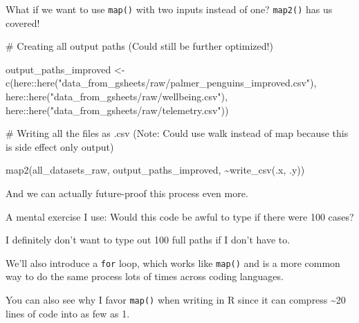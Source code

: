 \documentclass[
  letterpaper,
  DIV=11,
  numbers=noendperiod]{scrreprt}
\newenvironment{Shaded}{\begin{snugshade}}{\end{snugshade}}
\newcommand{\CommentTok}[1]{\textcolor[rgb]{0.37,0.37,0.37}{#1}}
\newcommand{\FunctionTok}[1]{\textcolor[rgb]{0.28,0.35,0.67}{#1}}
\newcommand{\NormalTok}[1]{\textcolor[rgb]{0.00,0.23,0.31}{#1}}
\newcommand{\OtherTok}[1]{\textcolor[rgb]{0.00,0.23,0.31}{#1}}
\newcommand{\SpecialCharTok}[1]{\textcolor[rgb]{0.37,0.37,0.37}{#1}}
\newcommand{\StringTok}[1]{\textcolor[rgb]{0.13,0.47,0.30}{#1}}
\begin{document}
What if we want to use \texttt{map()} with two inputs instead of one?
\texttt{map2()} has us covered!

\begin{Shaded}
\begin{Highlighting}[]
\CommentTok{\# Creating all output paths (Could still be further optimized!)}

\NormalTok{output\_paths\_improved }\OtherTok{\textless{}{-}} \FunctionTok{c}\NormalTok{(here}\SpecialCharTok{::}\FunctionTok{here}\NormalTok{(}\StringTok{"data\_from\_gsheets/raw/palmer\_penguins\_improved.csv"}\NormalTok{),}
\NormalTok{                           here}\SpecialCharTok{::}\FunctionTok{here}\NormalTok{(}\StringTok{"data\_from\_gsheets/raw/wellbeing.csv"}\NormalTok{),}
\NormalTok{                           here}\SpecialCharTok{::}\FunctionTok{here}\NormalTok{(}\StringTok{"data\_from\_gsheets/raw/telemetry.csv"}\NormalTok{))}

\CommentTok{\# Writing all the files as .csv (Note: Could use \textasciigrave{}walk\textasciigrave{} instead of \textasciigrave{}map\textasciigrave{} because this is side effect only output)}

\FunctionTok{map2}\NormalTok{(all\_datasets\_raw, output\_paths\_improved, }\SpecialCharTok{\textasciitilde{}}\FunctionTok{write\_csv}\NormalTok{(.x, .y))}
\end{Highlighting}
\end{Shaded}

And we can actually future-proof this process even more.

A mental exercise I use: Would this code be awful to type if there were
100 cases?

I definitely don't want to type out 100 full paths if I don't have to.

We'll also introduce a \texttt{for} loop, which works like
\texttt{map()} and is a more common way to do the same process lots of
times across coding languages.

You can also see why I favor \texttt{map()} when writing in R since it
can compress \textasciitilde20 lines of code into as few as 1.
\end{document}
